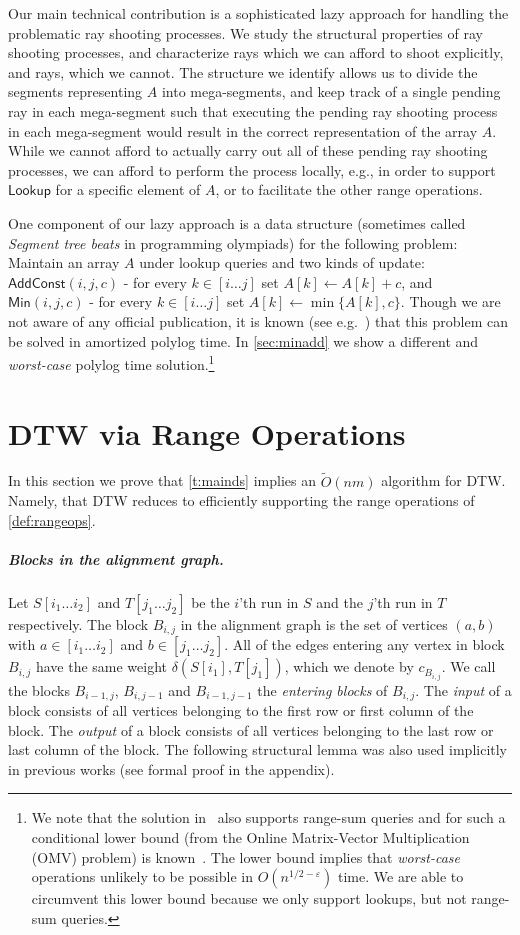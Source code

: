 \documentclass[10pt,a4paper]{article}
\newcommand{\local}{\text{short }}
\newcommand{\longrange}{\text{long }}
\newcommand{\Lookup}{\mathsf{Lookup}}
\newcommand{\Add}{\mathsf{AddConst}}
\newcommand{\Min}{\mathsf{Min}}
\newcommand{\para}[1]{\vspace{-0.1in} \subparagraph*{#1}}
\begin{document}
Our main technical contribution is a sophisticated lazy approach for handling the problematic ray shooting processes. 
We study the structural properties of ray shooting processes, and characterize \longrange rays which we can afford to shoot explicitly, and \local rays, which we cannot. The structure we identify allows us to divide the segments representing $A$ into mega-segments, and keep track of a single pending \local ray in each mega-segment such that executing the pending ray shooting process in each mega-segment would result in the correct representation of the array $A$. While we cannot afford to actually carry out all of these pending ray shooting processes, we can afford to perform the process locally, e.g., in order to support $\Lookup$ for a specific element of $A$, or to facilitate the other range operations. 

One component of our lazy approach is a data structure (sometimes called {\em Segment tree beats} in programming olympiads) for the following problem: Maintain an array $A$ under lookup queries and two kinds of update: $\Add(i,j,c)$ - for every $k\in [i\ldots j]$ set $A[k] \leftarrow A[k]+c$, and $\Min(i,j,c)$ - for every $k\in [i\ldots j]$ set $A[k] \leftarrow \min\{A[k],c\}$. Though we are not aware of any official publication, it is known (see e.g.~\cite{beats}) that this problem can be solved in amortized polylog time. In \cref{sec:minadd} we show a different and {\em worst-case} polylog time solution.\footnote{We note that the solution in~\cite{beats} also supports range-sum queries and for such a conditional lower bound (from the Online Matrix-Vector Multiplication (OMV) problem) is  known~\cite{Private}. The lower bound implies that {\em worst-case} operations unlikely to be possible in $O(n^{1/2-\varepsilon})$ time. 
We are able to circumvent this lower bound because we only support lookups, but not range-sum queries. 
}

\section{DTW via Range Operations}
\label{sec:DTWtoRanges}

In this section we prove that \cref{t:mainds} implies an $\tilde O(nm)$ algorithm for DTW. Namely, that DTW reduces to efficiently supporting the range operations of \cref{def:rangeops}.

\para{Blocks in the alignment graph.}
Let $S[i_1 \ldots i_2]$ and $T[j_1 \ldots j_2]$ be the $i$'th run in $S$ and the $j$'th run in $T$ respectively. 
The block $B_{i,j}$ in the alignment graph is the set of vertices $(a,b)$ with $a\in [i_1 \ldots i_2]$ and $b\in [j_1 \ldots j_2]$.
All of the edges entering any vertex in block $B_{i,j}$ have the same weight $\delta(S[i_1],T[j_1])$, which we denote by $c_{B_{i,j}}$. 
We call the blocks $B_{i-1,j}$, $B_{i,j-1}$ and $B_{i-1,j-1}$ the {\em entering blocks} of $B_{i,j}$. The {\em input} of a block consists of all vertices belonging to the first row or first column of the block. The {\em output} of a block consists of all vertices belonging to the last row or last column of the block. The following structural lemma was also used implicitly in previous works (see formal proof in the appendix). 
\end{document}
